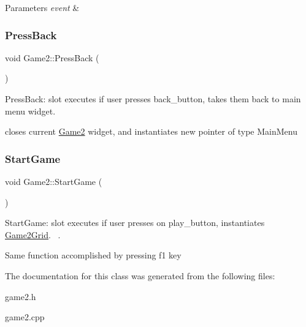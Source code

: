 \begin{DoxyParams}{Parameters}
{\em event} & \\
\hline
\end{DoxyParams}
\mbox{\label{classGame2_a06e537364fffde28c04697db4855ade0}} 
\subsubsection{\texorpdfstring{Press\+Back}{PressBack}}
{\footnotesize\ttfamily void Game2\+::\+Press\+Back (\begin{DoxyParamCaption}{ }\end{DoxyParamCaption})\hspace{0.3cm}{\ttfamily [slot]}}



Press\+Back\+: slot executes if user presses back\+\_\+button, takes them back to main menu widget. 

closes current \hyperlink{classGame2}{Game2} widget, and instantiates new pointer of type Main\+Menu \mbox{\label{classGame2_a2f51124a2ec3758fbc1bfd056ca137b6}} 
\subsubsection{\texorpdfstring{Start\+Game}{StartGame}}
{\footnotesize\ttfamily void Game2\+::\+Start\+Game (\begin{DoxyParamCaption}{ }\end{DoxyParamCaption})\hspace{0.3cm}{\ttfamily [slot]}}



Start\+Game\+: slot executes if user presses on play\+\_\+button, instantiates \hyperlink{classGame2Grid}{Game2\+Grid}.~\newline
. 

Same function accomplished by pressing f1 key 

The documentation for this class was generated from the following files\+:\begin{DoxyCompactItemize}
\item 
game2.\+h\item 
game2.\+cpp\end{DoxyCompactItemize}
